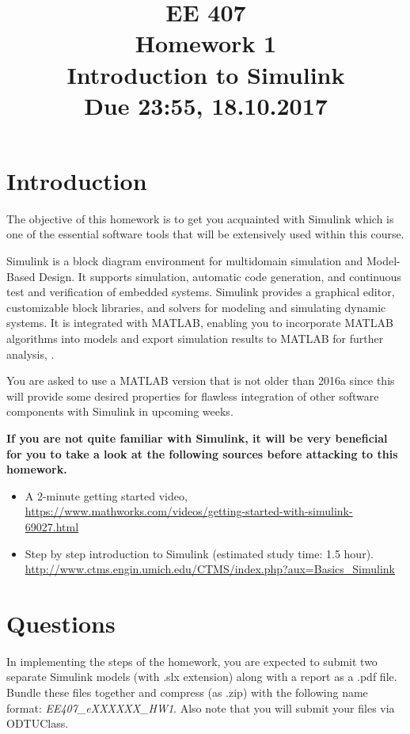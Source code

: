 \documentclass[12pt]{article}
\title{\vspace{-50pt}\textbf{EE 407\\Homework 1}\\
\large Introduction to Simulink \\ Due 23:55, 18.10.2017}
\author{}
\date{}
\theoremstyle{plain}
\theoremstyle{definition}
\begin{document}
\maketitle
\setcounter{section}{0}
\vspace{-70pt}


\section{Introduction}
The objective of this homework is to get you acquainted with Simulink which is one of the essential software tools that will be extensively used within this course.

Simulink is a block diagram environment for multidomain simulation and Model-Based Design. It supports simulation, automatic code generation, and continuous test and verification of embedded systems. Simulink provides a graphical editor, customizable block libraries, and solvers for modeling and simulating dynamic systems. 
It is integrated with MATLAB, enabling you to incorporate MATLAB algorithms into models and export simulation results to MATLAB for further analysis, \cite{SimulinkIntro}.

You are asked to use a MATLAB version that is not older than 2016a since this will provide some desired properties for flawless integration of other software components with Simulink in upcoming weeks.

\textbf{If you are not quite familiar with Simulink, it will be very beneficial for you to take a look at the following sources before attacking to this homework.}
\begin{itemize}
	\item A 2-minute getting started video,\\
	\url{https://www.mathworks.com/videos/getting-started-with-simulink-69027.html}	
	
	\item Step by step introduction to Simulink (estimated study time: 1.5 hour).\\
	\url{http://www.ctms.engin.umich.edu/CTMS/index.php?aux=Basics_Simulink}
\end{itemize}


\section{Questions}
	 In implementing the steps of the homework, you are expected to submit two separate Simulink models (with .slx extension) along with a report as a .pdf file. Bundle these files together and compress (as .zip) with the following name format: \textit{EE407\_eXXXXXX\_HW1}. Also note that you will submit your files via ODTUClass.
	
\end{document}
